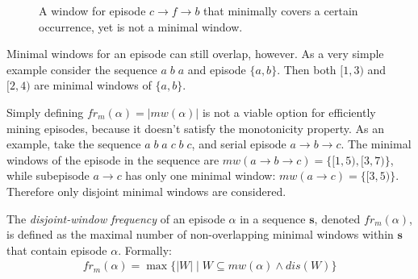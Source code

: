 \begin{figure}
\centering


\caption{A window for episode $ c \to f \to b $ that minimally covers a certain occurrence, yet is not a minimal window.}
\label{fig:mwi-non-minimal-window}
\end{figure}

Minimal windows for an episode can still overlap, however. As a very simple example consider the sequence $ a\;b\;a $ and episode $ \{ a, b \} $. Then both $ [1, 3) $ and $ [2, 4) $ are minimal windows of $ \{ a, b \} $.

Simply defining $ fr_m(\alpha) = | mw(\alpha) | $ is not a viable option for efficiently mining episodes, because it doesn't satisfy the monotonicity property. As an example, take the sequence $ a\;b\;a\;c\;b\;c $, and serial episode $ a \to b \to c $. The minimal windows of the episode in the sequence are $ mw(a \to b \to c) = \{ [1, 5), [3, 7) \} $, while subepisode $ a \to c $ has only one minimal window: $ mw(a \to c) = \{ [3, 5) \} $. Therefore only disjoint minimal windows are considered.

\begin{definition}
The \emph{disjoint-window frequency} of an episode $ \alpha $ in a sequence $ \boldsymbol{s} $, denoted $ fr_m(\alpha) $, is defined as the maximal number of non-overlapping minimal windows within $ \boldsymbol{s} $ that contain episode $ \alpha $. Formally:
\begin{align*}
fr_m(\alpha) = \max\{ | W | \mid W \subseteq mw(\alpha) \wedge dis(W) \}
\end{align*}
\end{definition}

